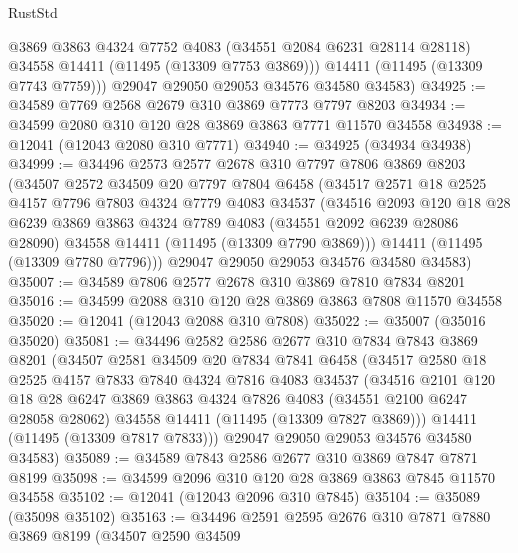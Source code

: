 \begin{lexlean}{RustStd}
\begin{coremodule}
          @3869
          @3863
          @4324
          @7752
          @4083
          (@34551 @2084 @6231 @28114 @28118)
          @34558
          @14411
          (@11495 (@13309 @7753 @3869)))
        @14411
        (@11495 (@13309 @7743 @7759)))
      @29047
      @29050
      @29053
      @34576
      @34580
      @34583)
@34925 := @34589 @7769 @2568 @2679 @310 @3869 @7773 @7797 @8203
@34934 := @34599 @2080 @310 @120 @28 @3869 @3863 @7771 @11570 @34558
@34938 := @12041 (@12043 @2080 @310 @7771)
@34940 := @34925 (@34934 @34938)
@34999 := @34496
    @2573
    @2577
    @2678
    @310
    @7797
    @7806
    @3869
    @8203
    (@34507
      @2572
      @34509
      @20
      @7797
      @7804
      @6458
      (@34517
        @2571
        @18
        @2525
        @4157
        @7796
        @7803
        @4324
        @7779
        @4083
        @34537
        (@34516
          @2093
          @120
          @18
          @28
          @6239
          @3869
          @3863
          @4324
          @7789
          @4083
          (@34551 @2092 @6239 @28086 @28090)
          @34558
          @14411
          (@11495 (@13309 @7790 @3869)))
        @14411
        (@11495 (@13309 @7780 @7796)))
      @29047
      @29050
      @29053
      @34576
      @34580
      @34583)
@35007 := @34589 @7806 @2577 @2678 @310 @3869 @7810 @7834 @8201
@35016 := @34599 @2088 @310 @120 @28 @3869 @3863 @7808 @11570 @34558
@35020 := @12041 (@12043 @2088 @310 @7808)
@35022 := @35007 (@35016 @35020)
@35081 := @34496
    @2582
    @2586
    @2677
    @310
    @7834
    @7843
    @3869
    @8201
    (@34507
      @2581
      @34509
      @20
      @7834
      @7841
      @6458
      (@34517
        @2580
        @18
        @2525
        @4157
        @7833
        @7840
        @4324
        @7816
        @4083
        @34537
        (@34516
          @2101
          @120
          @18
          @28
          @6247
          @3869
          @3863
          @4324
          @7826
          @4083
          (@34551 @2100 @6247 @28058 @28062)
          @34558
          @14411
          (@11495 (@13309 @7827 @3869)))
        @14411
        (@11495 (@13309 @7817 @7833)))
      @29047
      @29050
      @29053
      @34576
      @34580
      @34583)
@35089 := @34589 @7843 @2586 @2677 @310 @3869 @7847 @7871 @8199
@35098 := @34599 @2096 @310 @120 @28 @3869 @3863 @7845 @11570 @34558
@35102 := @12041 (@12043 @2096 @310 @7845)
@35104 := @35089 (@35098 @35102)
@35163 := @34496
    @2591
    @2595
    @2676
    @310
    @7871
    @7880
    @3869
    @8199
    (@34507
      @2590
      @34509

\end{coremodule}
\end{lexlean}
